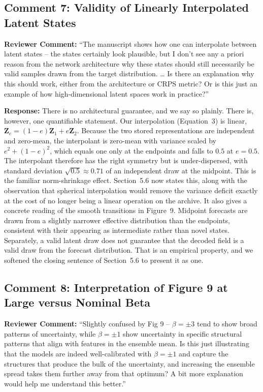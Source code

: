 \documentclass[12pt]{article}
\begin{document}
\subsection*{Comment 7: Validity of Linearly Interpolated Latent States}

\textbf{Reviewer Comment:} ``The manuscript shows how one can interpolate between
latent states -- the states certainly look plausible, but I don't see any a priori
reason from the network architecture why these states should still necessarily be
valid samples drawn from the target distribution. \ldots{} Is there an explanation why
this should work, either from the architecture or CRPS metric? Or is this just an
example of how high-dimensional latent spaces work in practice?''

\textbf{Response:} There is no architectural guarantee, and we say so plainly. There is,
however, one quantifiable statement. Our interpolation (Equation~3) is linear,
$\mathbf{Z}_e=(1-e)\mathbf{Z}_1+e\mathbf{Z}_2$. Because the two stored representations
are independent and zero-mean, the interpolant is zero-mean with variance scaled by
$e^2+(1-e)^2$, which equals one only at the endpoints and falls to $0.5$ at $e=0.5$.
The interpolant therefore has the right symmetry but is under-dispersed, with standard
deviation $\sqrt{0.5}\approx0.71$ of an independent draw at the midpoint. This is the
familiar norm-shrinkage effect. Section~5.6 now states this, along with the
observation that spherical interpolation would remove the variance deficit exactly at
the cost of no longer being a linear operation on the archive. It also gives a
concrete reading of the smooth transitions in Figure~9. Midpoint forecasts are drawn
from a slightly narrower effective distribution than the endpoints, consistent with
their appearing as intermediate rather than novel states. Separately, a valid latent
draw does not guarantee that the decoded field is a valid draw from the forecast
distribution. That is an empirical property, and we softened the closing sentence of
Section~5.6 to present it as one.

\subsection*{Comment 8: Interpretation of Figure 9 at Large versus Nominal Beta}

\textbf{Reviewer Comment:} ``Slightly confused by Fig 9 -- $\beta = \pm 3$ tend to
show broad patterns of uncertainty, while $\beta = \pm 1$ show uncertainty in specific
structural patterns that align with features in the ensemble mean. Is this just
illustrating that the models are indeed well-calibrated with $\beta = \pm 1$ and
capture the structures that produce the bulk of the uncertainty, and increasing the
ensemble spread takes them further away from that optimum? A bit more explanation
would help me understand this better.''
\end{document}
